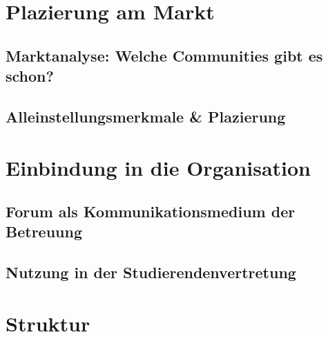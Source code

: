 \section{Plazierung am Markt} %
\label{sec:plazierung_am_markt}

\subsection{Marktanalyse: Welche Communities gibt es schon?} %
\label{sub:marktanalyse_welche_communities_gibt_es_schon}


\subsection{Alleinstellungsmerkmale \& Plazierung} %
\label{sub:alleinstellungsmerkmale_plazierung}



\section{Einbindung in die Organisation} %
\label{sec:einbindung_in_die_organisation}

\subsection{Forum als Kommunikationsmedium der Betreuung} %
\label{sub:forum_als_kommunikationsmedium_der_betreuung}


\subsection{Nutzung in der Studierendenvertretung} %
\label{sub:nutzung_in_der_studierendenvertretung}



\section{Struktur} %
\label{sec:struktur}

